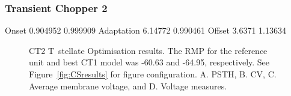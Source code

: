 \clearpage
\subsubsection{Transient Chopper 2}

Onset	    0.904952	0.999909
Adaptation  6.14772	0.990461
Offset	    3.6371	1.13634 


\begin{figure}[htb]
  \centering
  \caption[CT2 T~stellate Optimisation results]{CT2 T~stellate Optimisation
    results.  The RMP for the reference unit and best CT1 model was -60.63 and
    -64.95, respectively.  See Figure~\ref{fig:CSresults} for figure
    configuration.  A. PSTH, B. CV, C. Average membrane voltage, and D. Voltage
    measures.}
  \label{fig:CT2results}
\end{figure}



